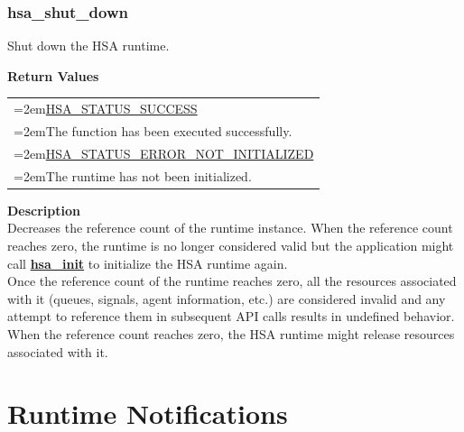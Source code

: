 \documentclass[final]{book}
\newcommand{\reffun}[1]{\textbf{#1}}
\newenvironment{mylongtable}{\rowcolors{0}{lightgray}{lightgray}\longtable} {
\endlongtable}
\begin{document}
\subsubsection{hsa_\-shut_\-down}
\vspace{-5.5mm}\begin{mylongtable}{@{}p{\textwidth}}

\end{mylongtable}
\vspace{-2mm}Shut down the HSA runtime.

\noindent\textbf{Return Values}\\[-6mm]
\noindent\begin{longtable}{@{}>{\hangindent=2em}p{\linewidth}}
\hyperlink{group__status_1ggad755322e7ff95456520e8abdbe90d225ae382ea0c9c05cce5a60d0317375159cc}{HSA_\-STATUS_\-SUCCESS}\\\hspace{2em}The function has been executed successfully.\\[2mm]
\hyperlink{group__status_1ggad755322e7ff95456520e8abdbe90d225a34ea59ade5bfce95eee935238a99f5b5}{HSA_\-STATUS_\-ERROR_\-NOT_\-INITIALIZED}\\\hspace{2em}The runtime has not been initialized.
\end{longtable}
\vspace{-5mm}\noindent\textbf{Description}\\[1mm]
Decreases the reference count of the runtime instance. When the reference count reaches zero, the runtime is no longer considered valid but the application might call \hyperlink{group__initshutdown_1ga5b8574433e7dbcbd31ea397a02e3c32b}{\reffun{hsa_\-init}} to initialize the HSA runtime again.\\[2mm]
Once the reference count of the runtime reaches zero, all the resources associated with it (queues, signals, agent information, etc.) are considered invalid and any attempt to reference them in subsequent API calls results in undefined behavior. When the reference count reaches zero, the HSA runtime might release resources associated with it. 
 

\section{Runtime Notifications}
\label{sec:error}
\end{document}
